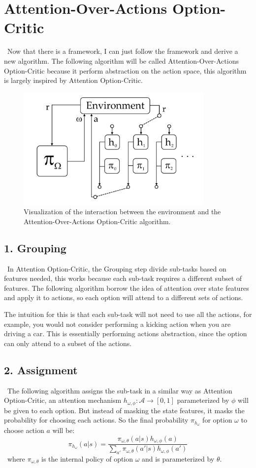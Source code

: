 \documentclass{article}
\begin{document}
	\section{Attention-Over-Actions Option-Critic}
	\qquad \ Now that there is a framework, I can just follow the framework and derive a new algorithm. The following algorithm will be called Attention-Over-Actions Option-Critic because it perform abstraction on the action space, this algorithm is largely inspired by Attention Option-Critic.
	\begin{figure}[h]
		\centering
		\includegraphics[width=3.8in]{aoaoc.png}
		\caption{Visualization of the interaction between the environment and the Attention-Over-Actions Option-Critic algorithm.}
	\end{figure}
	\subsection*{1. Grouping}
	\qquad \ In Attention Option-Critic, the Grouping step divide sub-tasks based on features needed, this works because each sub-task requires a different subset of features. The following algorithm borrow the idea of attention over state features and apply it to actions, so each option will attend to a different sets of actions. 
	
	\quad The intuition for this is that each sub-task will not need to use all the actions, for example, you would not consider performing a kicking action when you are driving a car. This is essentially performing actions abstraction, since the option can only attend to a subset of the actions.
	\subsection*{2. Assignment}
	\qquad \ The following algorithm assigns the sub-task in a similar way as Attention Option-Critic, an attention mechanism $h_{\omega,\phi}:\mathcal{A} \rightarrow [0,1]$ parameterized by $\phi$ will be given to each option. But instead of masking the state features, it masks the probability for choosing each actions. So the final probability $\pi_{h_\omega}$ for option $\omega$ to choose action $a$ will be: $$\pi_{h_\omega}(a|s) = \frac{\pi_{\omega,\theta}(a|s)h_{\omega, \phi}(a)}{\sum_{a'} \pi_{\omega,\theta}(a'|s)h_{\omega, \phi}(a')}$$ \qquad \ where $\pi_{\omega,\theta}$ is the internal policy of option $\omega$ and is parameterized by $\theta$.
\end{document}
